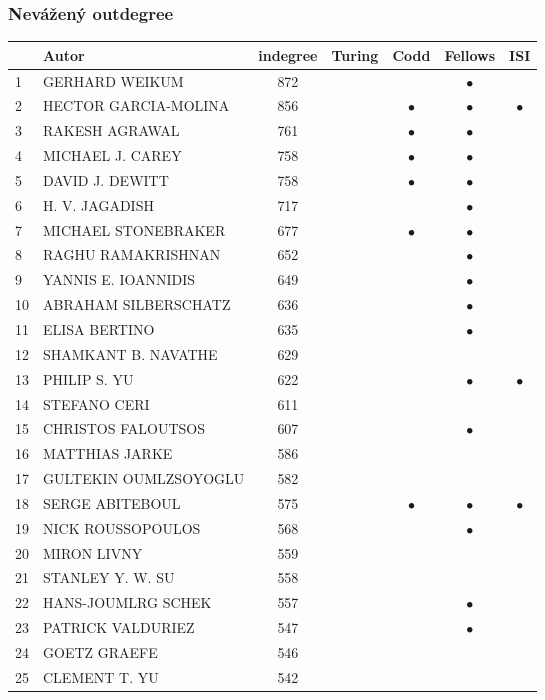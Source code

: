 \documentclass[12pt,titlepage]{report}
\begin{document}
\subsubsection{Nevážený outdegree}
\begin{center}
\begin{tabular}{|l|l|c|c|c|c|c|}
\hline
& {\bf Autor} & {\bf indegree} & {\bf Turing} & {\bf Codd} & {\bf Fellows} & {\bf ISI} \\
\hline
1  & GERHARD WEIKUM & 872&&         &$\bullet$&         \\
\hline
2  & HECTOR GARCIA-MOLINA & 856&&$\bullet$&$\bullet$&$\bullet$\\
\hline
3  & RAKESH AGRAWAL & 761&&$\bullet$&$\bullet$&         \\
\hline
4  & MICHAEL J. CAREY & 758&&$\bullet$&$\bullet$&         \\
\hline
5  & DAVID J. DEWITT & 758&&$\bullet$&$\bullet$&         \\
\hline
6  & H. V. JAGADISH & 717&&         &$\bullet$&         \\
\hline
7  & MICHAEL STONEBRAKER & 677&&$\bullet$&$\bullet$&         \\
\hline
8  & RAGHU RAMAKRISHNAN & 652&&         &$\bullet$&         \\
\hline
9  & YANNIS E. IOANNIDIS & 649&&         &$\bullet$&         \\
\hline
10 & ABRAHAM SILBERSCHATZ & 636&&         &$\bullet$&         \\
\hline
11 & ELISA BERTINO & 635&&         &$\bullet$&         \\
\hline
12 & SHAMKANT B. NAVATHE & 629&&         &         &         \\
\hline
13 & PHILIP S. YU & 622&&         &$\bullet$&$\bullet$\\
\hline
14 & STEFANO CERI & 611&&         &         &         \\
\hline
15 & CHRISTOS FALOUTSOS & 607&&         &$\bullet$&         \\
\hline
16 & MATTHIAS JARKE & 586&&         &         &         \\
\hline
17 & GULTEKIN OUMLZSOYOGLU & 582&&         &         &         \\
\hline
18 & SERGE ABITEBOUL & 575&&$\bullet$&$\bullet$&$\bullet$\\
\hline
19 & NICK ROUSSOPOULOS & 568&&         &$\bullet$&         \\
\hline
20 & MIRON LIVNY & 559&&         &         &         \\
\hline
21 & STANLEY Y. W. SU & 558&&         &         &         \\
\hline
22 & HANS-JOUMLRG SCHEK & 557&&         &$\bullet$&         \\
\hline
23 & PATRICK VALDURIEZ & 547&&         &$\bullet$&         \\
\hline
24 & GOETZ GRAEFE & 546&&         &         &         \\
\hline
25 & CLEMENT T. YU & 542&&         &         &         \\
\hline
\end{tabular}
\end{center}
\end{document}
